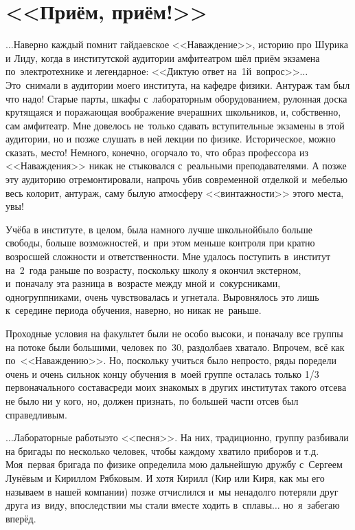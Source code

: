 \newpage
\section*{<<Приём, приём!>>}

$\ldots$Наверно каждый помнит гайдаевское <<Наваждение>>, историю про Шурика и Лиду, когда в институтской аудитории амфитеатром шёл приём экзамена по~электротехнике и легендарное: <<Диктую ответ на~1\sdash й~вопрос>>$\ldots$ Это~снимали в аудитории моего института, на кафедре физики. Антураж там был что надо! Старые парты, шкафы с~лабораторным оборудованием, рулонная доска крутящаяся и поражающая воображение вчерашних школьников, и, собственно, сам амфитеатр. Мне довелось не~только сдавать вступительные экзамены в этой аудитории, но и позже слушать в ней лекции по физике. Историческое, можно сказать, место! Немного, конечно, огорчало то, что образ профессора из <<Наваждения>> никак не стыковался с~реальными преподавателями. А позже эту аудиторию отремонтировали, напрочь убив современной отделкой и~мебелью весь колорит, антураж, саму былую атмосферу <<винтажности>> этого места, увы!

Учёба в институте, в целом, была намного лучше школьной\mdash было больше свободы, больше возможностей, и~при этом меньше контроля при кратно возросшей сложности и ответственности. Мне удалось поступить в~институт на~2~года раньше по возрасту, поскольку школу я окончил экстерном, и~поначалу эта разница в~возрасте между мной и~сокурсниками, одногруппниками, очень чувствовалась и угнетала. Выровнялось это лишь к~середине периода обучения, наверно, но никак не~раньше.

Проходные условия на факультет были не особо высоки, и поначалу все группы на потоке были большими, человек по~30, раздолбаев хватало. Впрочем, всё как по~<<Наваждению>>. Но, поскольку учиться было непросто, ряды поредели очень и очень сильно\mdash к концу обучения в~моей группе осталась только 1/3 первоначального состава\mdash среди моих знакомых в других институтах такого отсева не было ни у кого, но, должен признать, по большей части отсев был справедливым.

$\ldots$Лабораторные работы\mdash это <<песня>>. На них, традиционно, группу разбивали на бригады по несколько человек, чтобы каждому хватило приборов и т.д. Моя~первая бригада по физике определила мою дальнейшую дружбу с~Сергеем Лунёвым и Кириллом Рябковым. И хотя Кирилл (Кир или Киря, как мы его называем в нашей компании) позже отчислился и~мы ненадолго потеряли друг друга из~виду, впоследствии мы стали вместе ходить в~сплавы$\ldots$ но~я~забегаю вперёд. 

